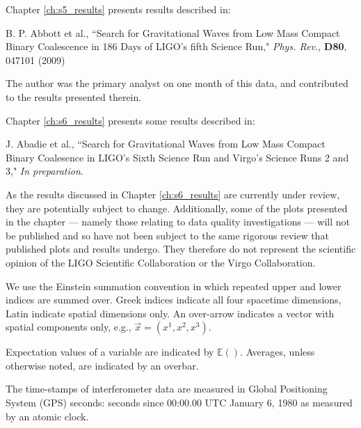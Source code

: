 \documentclass[12pt,notitlepage]{report}
\begin{document}
\vspace*{0.5cm}

\noindent Chapter \ref{ch:s5_results} presents results described in:

\vspace*{0.25cm}
\noindent B. P. Abbott et al., ``Search for Gravitational Waves from Low Mass Compact Binary Coalescence in 186 Days of LIGO's fifth Science Run," {\it Phys. Rev.,} {\bf D80}, 047101 (2009)

\vspace*{0.25cm}
\noindent The author was the primary analyst on one month of this data, and contributed to the results presented therein.

\vspace*{0.5cm}
\noindent Chapter \ref{ch:s6_results} presents some results described in:

\vspace*{0.25cm}
\noindent J. Abadie et al., ``Search for Gravitational Waves from Low Mass Compact Binary Coalesence in LIGO's Sixth Science Run and Virgo's Science Runs 2 and 3," {\it In preparation}.

\vspace*{0.25cm}
\noindent As the results discussed in Chapter \ref{ch:s6_results} are currently under review, they are potentially subject to change. Additionally, some of the plots presented in the chapter --- namely those relating to data quality investigations --- will not be published and so have not been subject to the same rigorous review that published plots and results undergo. They therefore do not represent the scientific opinion of the LIGO Scientific Collaboration or the Virgo Collaboration.


We use the Einstein summation convention in which repeated upper and lower
indices are summed over. Greek indices indicate all four spacetime dimensions,
Latin indicate spatial dimensions only. An over-arrow indicates a vector with
spatial components only, e.g., $\vec{x} = (x^1,x^2,x^3)$.

\vspace{0.5cm}

\noindent Expectation values of a variable are indicated by $\mathbb{E}()$.
Averages, unless otherwise noted, are indicated by an overbar.

\vspace{0.5cm}

\noindent The time-stamps of interferometer data are measured in
Global Positioning System (GPS) seconds: seconds since 00:00.00 UTC
January 6, 1980 as measured by an atomic clock.
\end{document}
